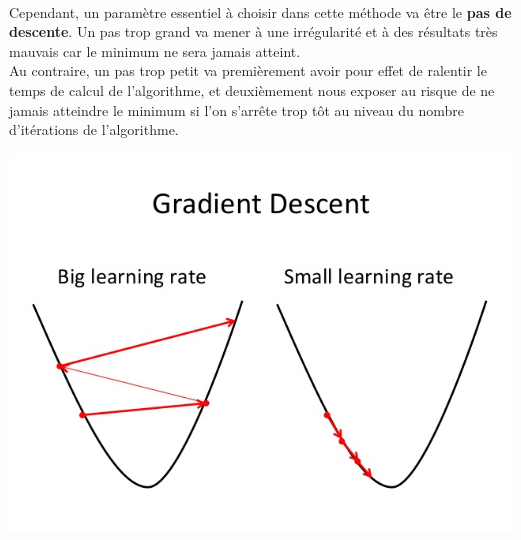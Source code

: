 \documentclass[14pt, openany]{article}
\begin{document}
\paragraph{}
Cependant, un paramètre essentiel à choisir dans cette méthode va être le \textbf{pas de descente}. Un pas trop grand va mener à une irrégularité et à des résultats très mauvais car le minimum ne sera jamais atteint.\\
Au contraire, un pas trop petit va premièrement avoir pour effet de ralentir le temps de calcul de l'algorithme, et deuxièmement nous exposer au risque de ne jamais atteindre le minimum si l'on s'arrête trop tôt au niveau du nombre d'itérations de l'algorithme.
\begin{center}
\includegraphics[scale=0.5]{Images/lr.jpg}
\end{center}
\begin{center}
\end{center}
\end{document}
